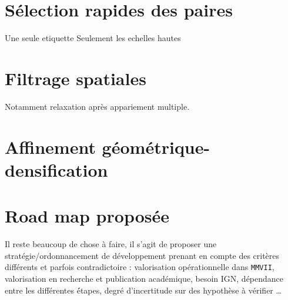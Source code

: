 \section{S\'election rapides des paires}

Une seule etiquette
Seulement les echelles hautes

\section{Filtrage spatiales}

Notamment relaxation apr\`es appariement multiple.

\section{Affinement g\'eom\'etrique-densification}


\section{Road map propos\'ee}

Il reste beaucoup de chose \`a faire, il s'agit de proposer une strat\'egie/ordonnancement de d\'eveloppement
prenant en compte des crit\`eres diff\'erents et parfois contradictoire :  valorisation
op\'erationnelle dans {\tt MMVII}, valorisation en recherche et publication acad\'emique,
besoin IGN, d\'ependance entre les diff\'erentes \'étapes, degr\'e d'incertitude sur des hypoth\`ese
\`a v\'erifier \dots 






